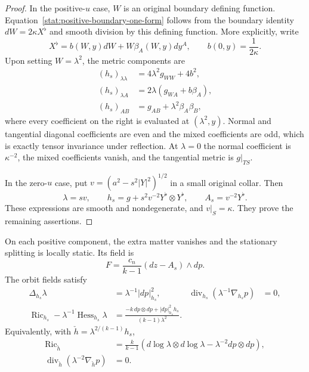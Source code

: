 \begin{proof}
In the positive-$u$ case, $W$ is an original boundary defining
function.  Equation~\eqref{stat:positive-boundary-one-form} follows
from the boundary identity $dW=2\kappa X^\flat$ and smooth
division by this defining function.  More explicitly, write
\[
 X^\flat=b(W,y)dW+W\beta_A(W,y)dy^A,
 \qquad b(0,y)=\frac1{2\kappa}.
\]
Upon setting $W=\lambda^2$, the metric components are
\begin{align*}
 (h_s)_{\lambda\lambda}
   &=4\lambda^2g_{WW}+4b^2,\\
 (h_s)_{\lambda A}
   &=2\lambda(g_{WA}+b\beta_A),\\
 (h_s)_{AB}&=g_{AB}+\lambda^2\beta_A\beta_B,
\end{align*}
where every coefficient on the right is evaluated at
$(\lambda^2,y)$.  Normal and tangential diagonal coefficients are
even and the mixed coefficients are odd, which is exactly tensor
invariance under reflection.  At $\lambda=0$ the normal coefficient
is $\kappa^{-2}$, the mixed coefficients vanish, and the tangential
metric is $g|_{TS}$.

In the zero-$u$ case, put
$v=(a^2-s^2|Y|^2)^{1/2}$ in a small original collar.  Then
\[
 \lambda=sv,\qquad
 h_s=g+s^2v^{-2}Y^\flat\otimes Y^\flat,\qquad
 A_s=v^{-2}Y^\flat.
\]
These expressions are smooth and nondegenerate, and $v|_S=\kappa$.
They prove the remaining assertions.
\end{proof}

\begin{lemma}
\label{stat:static-equations}
On each positive component, the extra matter vanishes and the
stationary splitting is locally static.  Its field is
\begin{equation}
 F=\frac{c_n}{k-1}(dz-A_s)\wedge dp.
 \label{stat:static-F}
\end{equation}
The orbit fields satisfy
\begin{align}
 \Delta_{h_s}\lambda&=\lambda^{-1}|dp|_{h_s}^2,
 &\operatorname{div}_{h_s}(\lambda^{-1}\nabla_{h_s}p)&=0,
 \label{stat:static-lapse-Maxwell}\\
 \operatorname{Ric}_{h_s}-\lambda^{-1}\operatorname{Hess}_{h_s}\lambda
   &=\frac{-k\,dp\otimes dp+|dp|_{h_s}^2h_s}
           {(k-1)\lambda^2}.
 \label{stat:static-Ricci}
\end{align}
Equivalently, with $\check h=\lambda^{2/(k-1)}h_s$,
\begin{align}
 \operatorname{Ric}_{\check h}
   &=\frac{k}{k-1}
       \left(d\log\lambda\otimes d\log\lambda
                       -\lambda^{-2}dp\otimes dp\right),
 \label{stat:conformal-static-Ricci}\\
 \operatorname{div}_{\check h}
       (\lambda^{-2}\nabla_{\check h}p)&=0.
 \label{stat:conformal-Maxwell}
\end{align}
\end{lemma}

